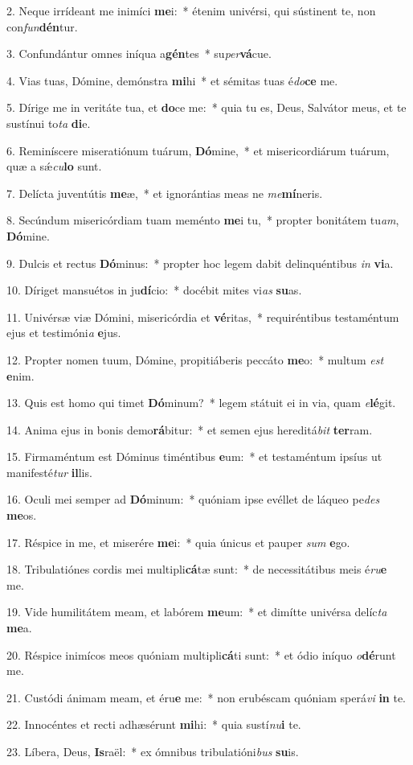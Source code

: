 2. Neque irrídeant me inimíci \textbf{me}i:~*  étenim univérsi, qui sústinent te, non con\textit{fun}\textbf{dén}tur.\

3. Confundántur omnes iníqua a\textbf{gén}tes~*  su\textit{per}\textbf{vá}cue.\

4. Vias tuas, Dómine, demónstra \textbf{mi}hi~*  et sémitas tuas é\textit{do}\textbf{ce} me.\

5. Dírige me in veritáte tua, et \textbf{do}ce me:~*  quia tu es, Deus, Salvátor meus, et te sustínui to\textit{ta} \textbf{di}e.\

6. Reminíscere miseratiónum tuárum, \textbf{Dó}mine,~*  et misericordiárum tuárum, quæ a sǽ\textit{cu}\textbf{lo} sunt.\

7. Delícta juventútis \textbf{me}æ,~*  et ignorántias meas ne \textit{me}\textbf{mí}neris.\

8. Secúndum misericórdiam tuam meménto \textbf{me}i tu,~*  propter bonitátem tu\textit{am}, \textbf{Dó}mine.\

9. Dulcis et rectus \textbf{Dó}minus:~*  propter hoc legem dabit delinquéntibus \textit{in} \textbf{vi}a.\

10. Díriget mansuétos in ju\textbf{dí}cio:~*  docébit mites vi\textit{as} \textbf{su}as.\

11. Univérsæ viæ Dómini, misericórdia et \textbf{vé}ritas,~*  requiréntibus testaméntum ejus et testimóni\textit{a} \textbf{e}jus.\

12. Propter nomen tuum, Dómine, propitiáberis peccáto \textbf{me}o:~*  multum \textit{est} \textbf{e}nim.\

13. Quis est homo qui timet \textbf{Dó}minum?~*  legem státuit ei in via, quam \textit{e}\textbf{lé}git.\

14. Anima ejus in bonis demo\textbf{rá}bitur:~*  et semen ejus hereditá\textit{bit} \textbf{ter}ram.\

15. Firmaméntum est Dóminus timéntibus \textbf{e}um:~*  et testaméntum ipsíus ut manifesté\textit{tur} \textbf{il}lis.\

16. Oculi mei semper ad \textbf{Dó}minum:~*  quóniam ipse evéllet de láqueo pe\textit{des} \textbf{me}os.\

17. Réspice in me, et miserére \textbf{me}i:~*  quia únicus et pauper \textit{sum} \textbf{e}go.\

18. Tribulatiónes cordis mei multipli\textbf{cá}tæ sunt:~*  de necessitátibus meis é\textit{ru}\textbf{e} me.\

19. Vide humilitátem meam, et labórem \textbf{me}um:~*  et dimítte univérsa delíc\textit{ta} \textbf{me}a.\

20. Réspice inimícos meos quóniam multipli\textbf{cá}ti sunt:~*  et ódio iníquo \textit{o}\textbf{dé}runt me.\

21. Custódi ánimam meam, et éru\textbf{e} me:~*  non erubéscam quóniam sperá\textit{vi} \textbf{in} te.\

22. Innocéntes et recti adhæsérunt \textbf{mi}hi:~*  quia sustí\textit{nu}\textbf{i} te.\

23. Líbera, Deus, \textbf{Is}raël:~*  ex ómnibus tribulatióni\textit{bus} \textbf{su}is.\

